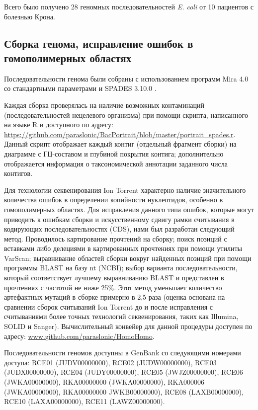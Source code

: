 Всего было получено 28 геномных последовательностей \textit{E. coli} от 10 пациентов с болезнью Крона.

\subsection{Сборка генома, исправление ошибок в гомополимерных областях}
Последовательности генома были собраны с использованием программ Mira 4.0 \cite{chevreux1999genome} со стандартными параметрами и SPADES 3.10.0 \cite{bankevich2012spades}.

Каждая сборка проверялась на наличие возможных контаминаций (последовательностей нецелевого организма) при помощи скрипта, написанного на языке R и доступного по адресу: \url{https://github.com/paraslonic/BacPortrait/blob/master/portrait\_spades.r}. Данный скрипт отображает каждый контиг (отдельный фрагмент сборки) на диаграмме с ГЦ-составом и глубиной покрытия контига; дополнительно отображается информация о таксономической аннотации заданного числа контигов. 
 
Для технологии секвенирования Ion Torrent характерно наличие значительного количества ошибок в определении копийности нуклеотидов, особенно в гомополимерных областях. Для исправления данного типа ошибок, которые могут приводить к ошибкам сборки и искусственному сдвигу рамки считывания в кодирующих последовательностях (CDS), нами был разработан следующий метод. Проводилось картирование прочтений на сборку; поиск позиций с вставками либо делециями в картированных прочтениях при помощи утилиты VarScan; выравнивание областей сборки вокруг найденных позиций при помощи программы BLAST на базу nt (NCBI); выбор варианта последовательности, который соответствует лучшему выравниванию BLAST и представлен в прочтениях с частотой не ниже 25\%. Этот метод уменьшает количество артефактных мутаций в сборке примерно в 2,5 раза (оценка основана на сравнении сборок считываний Ion Torrent до и после исправления с считываниями более точных технологий секвенирования, таких как Illumina, SOLID и Sanger). Вычислительный конвейер для данной процедуры доступен по адресу: \url{www.github.com/paraslonic/HomoHomo}.

Последовательности геномов доступны в GenBank со следующими номерами доступа: RCE01 (JUDV00000000), RCE02 (JUDW00000000), RCE03 (JUDX00000000), RCE04 (JUDY00000000), RCE05 (JWJZ00000000), RCE06 (JWKA00000000), RKA00000000 (JWKA00000000), RKA000006 (JWKA00000000), RKA00000000 JWKB00000000), RCE08 (LAXB00000000), RCE10 (LAXA00000000), RCE11 (LAWZ00000000).

